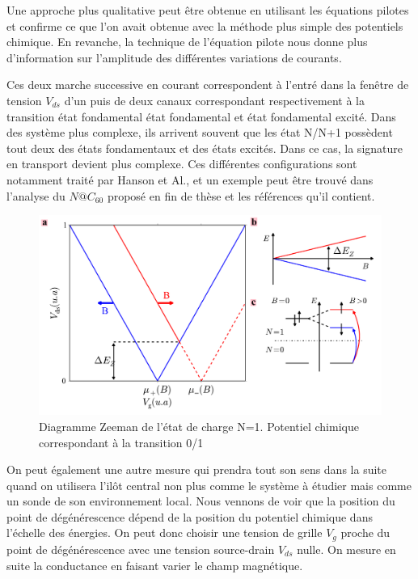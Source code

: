 Une approche plus qualitative peut \^etre obtenue en utilisant les équations pilotes et confirme ce que l'on avait obtenue avec la méthode plus simple des potentiels chimique. En revanche, la technique de l'équation pilote nous donne plus d'information sur l'amplitude des différentes variations de courants.

Ces deux marche successive en courant correspondent à l'entré dans la fen\^etre de tension $V_{ds}$ d'un puis de deux canaux correspondant respectivement à la transition état fondamental état fondamental et état fondamental excité. Dans des système plus complexe, ils arrivent souvent que les état N/N+1 possèdent tout deux des états fondamentaux et des états excités. Dans ce cas, la signature en transport devient plus complexe. Ces différentes configurations sont notamment traité par Hanson et Al., et un exemple peut \^etre trouvé dans l'analyse du $N@C_{60}$ proposé en fin de thèse et les références qu'il contient.

\begin{figure}
\includegraphics[scale=0.5]{Theorie/Transport/figure4/figure4.pdf} 
\caption{Diagramme Zeeman de l'état de charge N=1. Potentiel chimique correspondant à la transition 0/1}
\label{charge_discharge}
\end{figure}

On peut également une autre mesure qui prendra tout son sens dans la suite quand on utilisera l'il\^ot central non plus comme le système à étudier mais comme un sonde de son environnement local. Nous vennons de voir que la position du point de dégénérescence dépend de la position du potentiel chimique dans l'échelle des énergies. On peut donc choisir une tension de grille $V_g$ proche du point de dégénérescence avec une tension source-drain $V_{ds}$ nulle. On mesure en suite la conductance en faisant varier le champ magnétique.